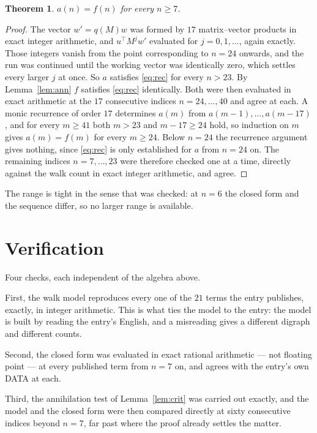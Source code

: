 \documentclass[11pt,a4paper]{article}
\theoremstyle{plain}
\newtheorem{theorem}{Theorem}
\theoremstyle{definition}
\begin{document}
\begin{theorem}
$a(n)=f(n)$ for every $n\ge7$.
\end{theorem}

\begin{proof}
The vector $w'=q(M)w$ was formed by $17$ matrix--vector products in exact integer
arithmetic, and $u^{\!\top}M^{j}w'$ evaluated for $j=0,1,\dots$, again exactly. Those integers
vanish from the point corresponding to $n=24$ onwards, and the run was continued until the
working vector was identically zero, which settles every larger $j$ at once. So $a$ satisfies
\eqref{eq:rec} for every $n>23$. By Lemma~\ref{lem:ann} $f$ satisfies \eqref{eq:rec}
identically. Both were then evaluated in exact arithmetic at the $17$ consecutive indices
$n=24,\dots,40$ and agree at each. A monic recurrence of order $17$
determines $a(m)$ from $a(m-1),\dots,a(m-17)$, and for every $m\ge41$ both
$m>23$ and $m-17\ge24$ hold, so induction on $m$ gives $a(m)=f(m)$ for every
$m\ge24$.
Below $n=24$ the recurrence argument gives nothing, since \eqref{eq:rec} is only
established for $a$ from $n=24$ on. The remaining indices $n=7,\dots,23$ were
therefore checked one at a time, directly against the walk count in exact integer arithmetic,
and agree.
\end{proof}

The range is tight in the sense that was checked: at $n=6$ the closed form and the sequence differ, so no larger range is available.

\section{Verification}

Four checks, each independent of the algebra above.

First, the walk model reproduces every one of the $21$ terms the entry publishes,
exactly, in integer arithmetic. This is what ties the model to the entry: the model is built
by reading the entry's English, and a misreading gives a different digraph and different
counts.

Second, the closed form was evaluated in exact rational arithmetic --- not floating point ---
at every published term from $n=7$ on, and agrees with the entry's own DATA at each.

Third, the annihilation test of Lemma~\ref{lem:crit} was carried out exactly, and the model
and the closed form were then compared directly at sixty consecutive indices beyond
$n=7$, far past where the proof already settles the matter.
\end{document}

